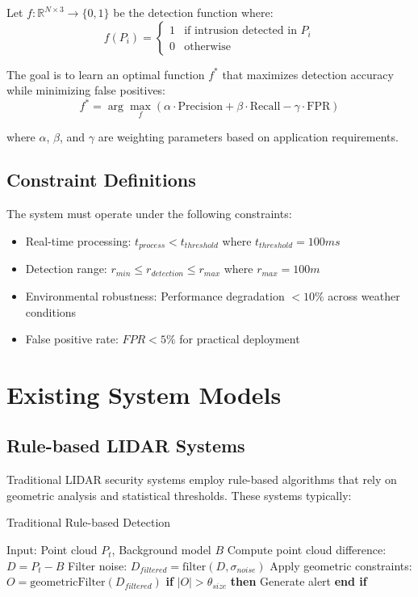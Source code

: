 \documentclass[conference]{IEEEtran}
\begin{document}
Let $f: \mathbb{R}^{N \times 3} \rightarrow \{0, 1\}$ be the detection function where:
\begin{equation}
f(P_i) = \begin{cases}
1 & \text{if intrusion detected in } P_i \\
0 & \text{otherwise}
\end{cases}
\end{equation}

The goal is to learn an optimal function $f^*$ that maximizes detection accuracy while minimizing false positives:
\begin{equation}
f^* = \arg\max_f \left( \alpha \cdot \text{Precision} + \beta \cdot \text{Recall} - \gamma \cdot \text{FPR} \right)
\end{equation}

where $\alpha$, $\beta$, and $\gamma$ are weighting parameters based on application requirements.

\subsection{Constraint Definitions}
The system must operate under the following constraints:
\begin{itemize}
\item Real-time processing: $t_{process} < t_{threshold}$ where $t_{threshold} = 100ms$
\item Detection range: $r_{min} \leq r_{detection} \leq r_{max}$ where $r_{max} = 100m$
\item Environmental robustness: Performance degradation $< 10\%$ across weather conditions
\item False positive rate: $FPR < 5\%$ for practical deployment
\end{itemize}

\section{Existing System Models}
\subsection{Rule-based LIDAR Systems}
Traditional LIDAR security systems employ rule-based algorithms that rely on geometric analysis and statistical thresholds. These systems typically:

\begin{algorithm}
\caption{Traditional Rule-based Detection}
\begin{algorithmic}[1]
\STATE Input: Point cloud $P_t$, Background model $B$
\STATE Compute point cloud difference: $D = P_t - B$
\STATE Filter noise: $D_{filtered} = \text{filter}(D, \sigma_{noise})$
\STATE Apply geometric constraints: $O = \text{geometricFilter}(D_{filtered})$
\STATE \textbf{if} $|O| > \theta_{size}$ \textbf{then}
\STATE \quad Generate alert
\STATE \textbf{end if}
\end{algorithmic}
\end{algorithm}
\end{document}
